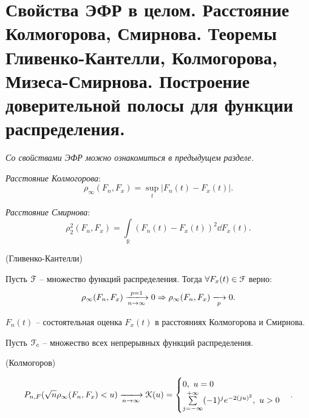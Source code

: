 \section{Свойства ЭФР в целом. Расстояние Колмогорова, Смирнова. Теоремы
Гливенко-Кантелли, Колмогорова, Мизеса-Смирнова. Построение доверительной
полосы для функции распределения.}

\textit{Со свойствами ЭФР можно ознакомиться в предыдущем разделе.}

\begin{definition}
  \textit{Расстояние Колмогорова}:
  \[
    \rho_{\infty} (F_n, F_x) = \sup_{t}|F_n(t) - F_x(t)|
  .\]
\end{definition}

\begin{definition}
  \textit{Расстояние Смирнова}:
  \[
    \rho^{2}_{2} (F_n, F_x) = \int\limits_{\mathbb{R}}(F_n(t) - F_x(t))^2
    \dd F_x(t)
  .\]
\end{definition}

\begin{theorem}(Гливенко-Кантелли)

  Пусть $\mathcal{F}$ -- множество функций распределения.
  Тогда $\forall F_x(t) \in \mathcal{F}$ верно:
  \[
    \rho_{\infty} (F_n, F_x) \xlongrightarrow[n \to \infty]{p=1} 0 \Rightarrow
    \rho_{\infty} (F_n, F_x) \xlongrightarrow[p]{} 0
  .\]

\end{theorem}

\begin{remark}
  $F_n(t)$ -- состоятельная оценка $F_x(t)$ в расстояниях Колмогорова и
  Смирнова.
\end{remark}

Пусть $\mathcal{F}_c$ -- множество всех непрерывных функций распределения.

\begin{theorem}(Колмогоров)

  \[
    P_{n, F}(\sqrt{n} \rho_{\infty} (F_n, F_x) < u)
    \xlongrightarrow[n \to \infty]{} \mathcal{K}(u) = \begin{cases}
      0,~ u = 0\\
      \sum\limits_{j = -\infty}^{+\infty} (-1)^j e^{-2 (ju)^2},~ u > 0
    \end{cases}
  .\]

\end{theorem}

